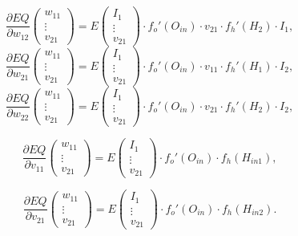 \documentclass[a4paper,12pt]{article}
\begin{document}
$$
    \frac{\partial EQ}{\partial w_{12}}\begin{pmatrix}w_{11}\\\vdots\\v_{21}\end{pmatrix} = E\begin{pmatrix}I_{1}\\ \vdots \\v_{21} \end{pmatrix}\cdot f_o'(O_{in})\cdot v_{21} \cdot f_h'(H_{2})\cdot I_{1},
$$
$$
    \frac{\partial EQ}{\partial w_{21}}\begin{pmatrix}w_{11}\\\vdots\\v_{21}\end{pmatrix} = E\begin{pmatrix}I_{1}\\ \vdots \\v_{21} \end{pmatrix}\cdot f_o'(O_{in})\cdot v_{11} \cdot f_h'(H_{1})\cdot I_{2},
$$
$$
    \frac{\partial EQ}{\partial w_{22}}\begin{pmatrix}w_{11}\\\vdots\\v_{21}\end{pmatrix} = E\begin{pmatrix}I_{1}\\ \vdots \\v_{21} \end{pmatrix}\cdot f_o'(O_{in})\cdot v_{21} \cdot f_h'(H_{2})\cdot I_{2},
$$

$$
    \frac{\partial EQ}{\partial v_{11}}\begin{pmatrix}w_{11}\\\vdots\\v_{21}\end{pmatrix} = E\begin{pmatrix}I_{1}\\ \vdots \\v_{21} \end{pmatrix}\cdot f_o'(O_{in})\cdot f_h(H_{in 1}),
$$

$$
    \frac{\partial EQ}{\partial v_{21}}\begin{pmatrix}w_{11}\\\vdots\\v_{21}\end{pmatrix} = E\begin{pmatrix}I_{1}\\ \vdots \\v_{21} \end{pmatrix}\cdot f_o'(O_{in})\cdot f_h(H_{in 2}).
$$
\end{document}
